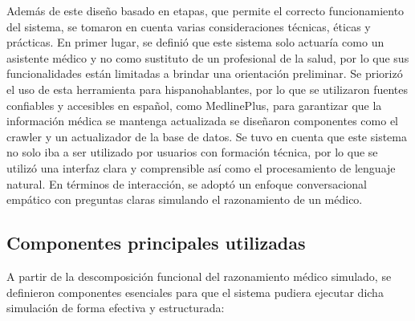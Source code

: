 \documentclass{llncs}
\begin{document}
Además de este diseño basado en etapas, que permite el correcto funcionamiento del sistema, se tomaron en cuenta varias consideraciones técnicas, éticas y prácticas. En primer lugar, se definió que este sistema solo actuaría como un
asistente médico y no como sustituto de un profesional de la salud, por lo que sus funcionalidades están limitadas a brindar una orientación preliminar. Se priorizó el uso de esta herramienta para hispanohablantes, por lo que se utilizaron
fuentes confiables y accesibles en español, como MedlinePlus\cite{medlineplus}, para garantizar que la información médica se mantenga actualizada se diseñaron componentes como el crawler y un actualizador de la base de datos. Se tuvo en cuenta
que este sistema no solo iba a ser utilizado por usuarios con formación técnica, por lo que se utilizó una interfaz clara y comprensible así como el procesamiento de lenguaje natural. En términos de interacción, se adoptó un enfoque conversacional
empático con preguntas claras simulando el razonamiento de un médico.

\subsection{Componentes principales utilizadas}

A partir de la descomposición funcional del razonamiento médico simulado, se definieron componentes esenciales para que el sistema pudiera ejecutar dicha simulación de forma efectiva y estructurada:
\end{document}
